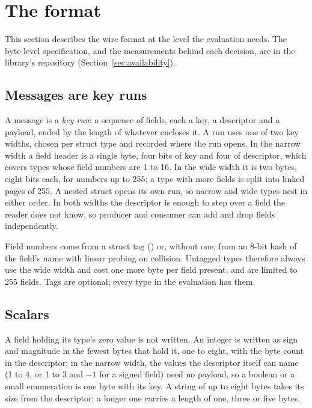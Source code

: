 \section{The format}
\label{sec:format}

This section describes the wire format at the level the evaluation needs. The
byte-level specification, and the measurements behind each decision, are in
the library's repository (Section~\ref{sec:availability}).

\subsection{Messages are key runs}

A message is a \emph{key run}: a sequence of fields, each a key, a descriptor
and a payload, ended by the length of whatever encloses it. A run uses one of
two key widths, chosen per struct type and recorded where the run opens. In
the narrow width a field header is a single byte, four bits of key and four
of descriptor, which covers types whose field numbers are 1 to 16. In the wide
width it is two bytes, eight bits each, for numbers up to 255; a type with
more fields is split into linked pages of 255. A nested struct opens its own
run, so narrow and wide types nest in either order. In both widths the
descriptor is enough to step over a field the reader does not know, so
producer and consumer can add and drop fields independently.

Field numbers come from a struct tag () or, without one, from an
8-bit hash of the field's name with linear probing on collision. Untagged
types therefore always use the wide width and cost one more byte per field
present, and are limited to 255 fields. Tags are optional; every type in the
evaluation has them.

\subsection{Scalars}

A field holding its type's zero value is not written. An integer is written as
sign and magnitude in the fewest bytes that hold it, one to eight, with the
byte count in the descriptor; in the narrow width, the values the descriptor
itself can name (1 to 4, or 1 to 3 and $-1$ for a signed field) need no
payload, so a boolean or a small enumeration is one byte with its key. A
string of up to eight bytes takes its size from the descriptor; a longer one
carries a length of one, three or five bytes.

